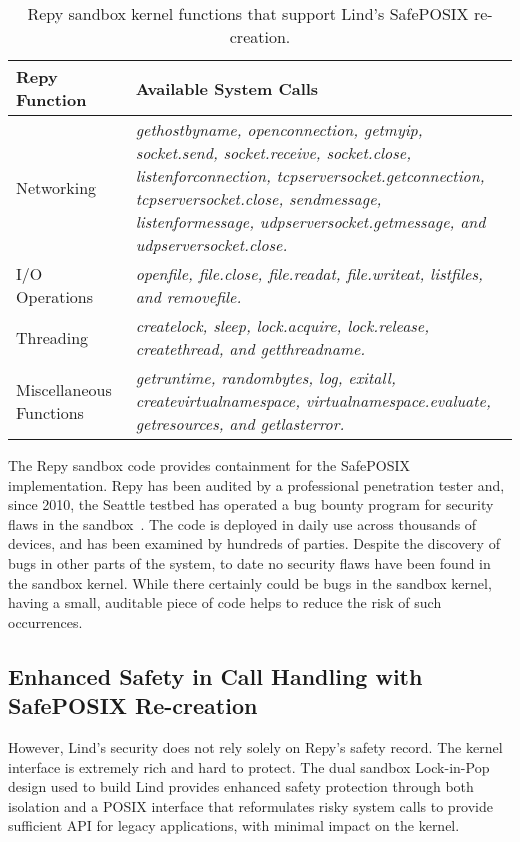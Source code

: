 \begin{table}
\centering
\caption {Repy sandbox kernel functions that support Lind's SafePOSIX re-creation.}

  \begin{tabular}{ | p{2.5cm} | p{4.5cm} |}
  \hline
  \textbf{Repy Function} & \textbf{Available System Calls}  \\ \hline

Networking & \emph{gethostbyname, openconnection, getmyip, socket.send, socket.receive, socket.close,
listenforconnection, tcpserversocket.getconnection, tcpserversocket.close, sendmessage, listenformessage,
udpserversocket.getmessage, and udpserversocket.close.} \\ \hline

I/O Operations & \emph{openfile, file.close, file.readat, file.writeat, listfiles, and removefile.} \\ \hline

Threading & \emph{createlock, sleep, lock.acquire, lock.release, createthread, and getthreadname.} \\ \hline

Miscellaneous Functions & \emph{getruntime, randombytes, log, exitall, createvirtualnamespace,
virtualnamespace.evaluate, getresources, and getlasterror.}  \\ \hline
    \end{tabular}
    \label{table:RepyKernel}
\end{table}

The Repy sandbox code provides containment for the SafePOSIX implementation.
Repy has been audited by a professional penetration tester and, since 2010,
the Seattle testbed has operated a bug bounty program for security flaws in the
sandbox~\cite{seattle}.
The code is deployed in daily use across thousands of devices, and has been examined by
hundreds of parties. Despite the discovery of bugs in other parts of the 
system, to date no security flaws have been found in the sandbox
kernel. While there certainly could be bugs in the sandbox kernel, having a 
small, auditable piece of code helps to reduce the risk of such occurrences.

\subsection{Enhanced Safety in Call Handling with SafePOSIX Re-creation}

However, Lind's security does not rely solely on Repy's
safety record.
The kernel interface is extremely rich and hard to protect.
The dual sandbox Lock-in-Pop design used to build Lind provides enhanced
safety protection through both isolation and a POSIX interface that
reformulates risky system calls to
provide sufficient API for legacy applications, with minimal impact on the kernel.

